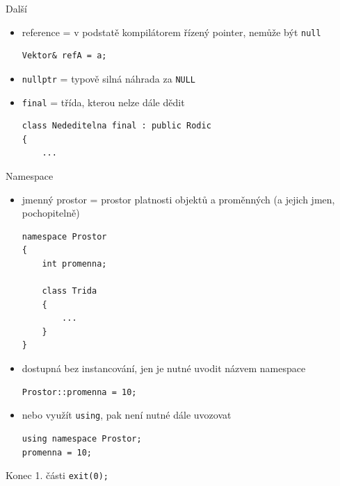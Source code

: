 \documentclass{beamer}
\begin{document}
\begin{xframe}{Další}
	\begin{itemize}
		\item reference = v podstatě kompilátorem řízený pointer, nemůže být \texttt{null}
\begin{lstlisting}[basicstyle=\fontsize{8}{9}\selectfont\ttfamily]
Vektor& refA = a;
\end{lstlisting}
		\item \texttt{nullptr} = typově silná náhrada za \texttt{NULL}
		\item \texttt{final} = třída, kterou nelze dále dědit
\begin{lstlisting}[basicstyle=\fontsize{8}{9}\selectfont\ttfamily]
class Nededitelna final : public Rodic
{
    ...
\end{lstlisting}
	\end{itemize}
\end{xframe}

\begin{xframe}{Namespace}
	\begin{itemize}
		\item jmenný prostor = prostor platnosti objektů a proměnných (a jejich jmen, pochopitelně)
\begin{lstlisting}[basicstyle=\fontsize{8}{9}\selectfont\ttfamily]
namespace Prostor
{
    int promenna;

    class Trida
    {
        ...
    }
}
\end{lstlisting}
		\item dostupná bez instancování, jen je nutné uvodit názvem namespace
\begin{lstlisting}[basicstyle=\fontsize{8}{9}\selectfont\ttfamily]
Prostor::promenna = 10;
\end{lstlisting}
		\item nebo využít \texttt{using}, pak není nutné dále uvozovat
\begin{lstlisting}[basicstyle=\fontsize{8}{9}\selectfont\ttfamily]
using namespace Prostor;
promenna = 10;
\end{lstlisting}
	\end{itemize}
\end{xframe}



\begin{xframe}{Konec 1. části}
\texttt{exit(0);}
\end{xframe}
\end{document}
